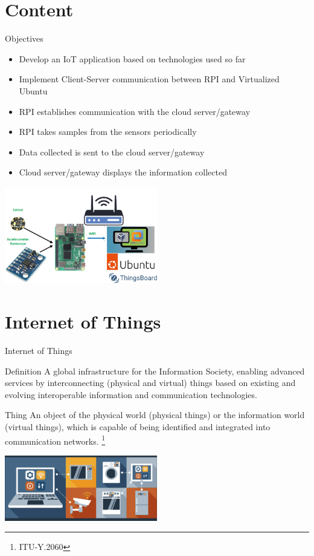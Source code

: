 \section{Content}
\begin{frame}{Objectives}
    \begin{itemize}
        \item Develop an IoT application based on technologies used so far
        \item Implement Client-Server communication between RPI and Virtualized Ubuntu
        \item RPI establishes communication with the cloud server/gateway
        \item RPI takes samples from the sensors periodically
        \item Data collected is sent to the cloud server/gateway
        \item Cloud server/gateway displays the information collected
       
    \end{itemize}
     \centering
     \includegraphics[width=0.5\textwidth]{trainingmaterials/project2-iot/schemacomplete.jpg}
\end{frame}

\section{Internet of Things}
\begin{frame}{Internet of Things}
    \begin{block}{Definition}
        A global infrastructure for the Information Society, enabling advanced services by interconnecting (physical and virtual) things based on existing and evolving interoperable information and communication technologies.
    \end{block}
    \begin{block}{Thing}
        An object of the physical world (physical things) or the information world (virtual things), which is capable of being identified and integrated into communication networks.
        \footnote{ITU-Y.2060}
    \end{block}
    \centering
    \includegraphics[width=0.5\textwidth]{trainingmaterials/project2-iot/internet-of-things2.png}
    
\end{frame}

